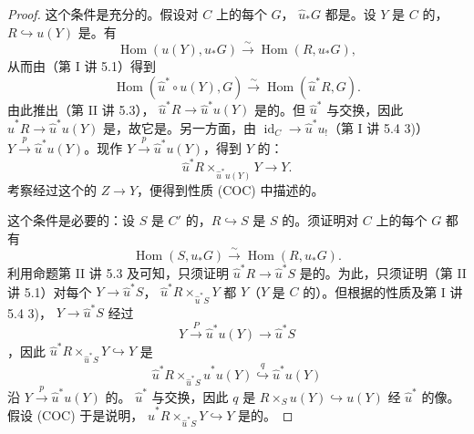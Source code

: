 \begin{proof}
这个条件是充分的。假设对 $C$ 上的每个 $G$， $\widehat u_*G$ 都是。设 $Y$ 是 $C$ 的，$R\hookrightarrow u(Y)$ 是。有
\[
 \operatorname{Hom}(u(Y),u_*G)\xrightarrow{\sim}\operatorname{Hom}(R,u_*G),
\]
从而由（第 I 讲 5.1）得到
\[
 \operatorname{Hom}(\widehat u^*\circ u(Y),G)\xrightarrow{\sim}\operatorname{Hom}(\widehat u^*R,G).
\]
由此推出（第 II 讲 5.3）， $\widehat u^*R\to\widehat u^*u(Y)$ 是的。但 $\widehat u^*$ 与交换，因此 $\widehat u^*R\to\widehat u^*u(Y)$ 是，故它是。另一方面，由 $\operatorname{id}_C\to\widehat u^*u_!$（第 I 讲 5.4 3)） $Y\xrightarrow p\widehat u^*u(Y)$。现作 $Y\xrightarrow p\widehat u^*u(Y)$，得到 $Y$ 的：
\[
 \widehat u^*R\times_{\widehat u^*u(Y)}Y\longrightarrow Y.
\]
考察经过这个的 $Z\to Y$，便得到性质 (COC) 中描述的。

这个条件是必要的：设 $S$ 是 $C'$ 的，$R\hookrightarrow S$ 是 $S$ 的。须证明对 $C$ 上的每个 $G$ 都有
\[
 \operatorname{Hom}(S,u_*G)\xrightarrow{\sim}\operatorname{Hom}(R,u_*G).
\]
利用命题第 II 讲 5.3 及可知，只须证明 $\widehat u^*R\to\widehat u^*S$ 是的。为此，只须证明（第 II 讲 5.1）对每个 $Y\to\widehat u^*S$， $\widehat u^*R\times_{\widehat u^*S}Y$ 都 $Y$（$Y$ 是 $C$ 的）。但根据的性质及第 I 讲 5.4 3)， $Y\to\widehat u^*S$ 经过
\[
 Y\xrightarrow{P}\widehat u^*u(Y)\longrightarrow\widehat u^*S
\]
，因此 $\widehat u^*R\times_{\widehat u^*S}Y\hookrightarrow Y$ 是
\[
 \widehat u^*R\times_{\widehat u^*S}\widehat u^*u(Y)\overset{q}{\hookrightarrow}\widehat u^*u(Y)
\]
沿 $Y\xrightarrow p\widehat u^*u(Y)$ 的。 $\widehat u^*$ 与交换，因此 $q$ 是 $R\times_Su(Y)\hookrightarrow u(Y)$ 经 $\widehat u^*$ 的像。假设 (COC) 于是说明， $\widehat u^*R\times_{\widehat u^*S}Y\hookrightarrow Y$ 是的。
\end{proof}

